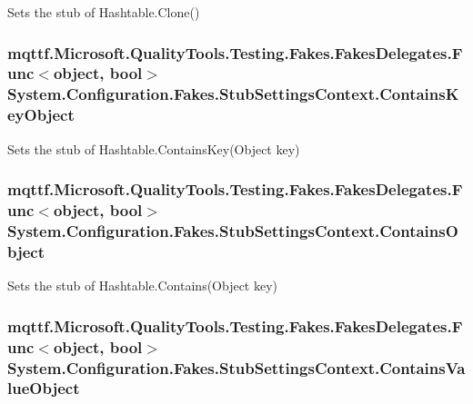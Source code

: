 Sets the stub of Hashtable.\-Clone()

\hypertarget{class_system_1_1_configuration_1_1_fakes_1_1_stub_settings_context_a4f23811f03a3a5e4f42611fa9592d583}{
\subsubsection[{Contains\-Key\-Object}]{\setlength{\rightskip}{0pt plus 5cm}mqttf.\-Microsoft.\-Quality\-Tools.\-Testing.\-Fakes.\-Fakes\-Delegates.\-Func$<$object, bool$>$ System.\-Configuration.\-Fakes.\-Stub\-Settings\-Context.\-Contains\-Key\-Object}}\label{class_system_1_1_configuration_1_1_fakes_1_1_stub_settings_context_a4f23811f03a3a5e4f42611fa9592d583}


Sets the stub of Hashtable.\-Contains\-Key(\-Object key)

\hypertarget{class_system_1_1_configuration_1_1_fakes_1_1_stub_settings_context_aee986a4c0cdcb11d5a98efda0f920348}{
\subsubsection[{Contains\-Object}]{\setlength{\rightskip}{0pt plus 5cm}mqttf.\-Microsoft.\-Quality\-Tools.\-Testing.\-Fakes.\-Fakes\-Delegates.\-Func$<$object, bool$>$ System.\-Configuration.\-Fakes.\-Stub\-Settings\-Context.\-Contains\-Object}}\label{class_system_1_1_configuration_1_1_fakes_1_1_stub_settings_context_aee986a4c0cdcb11d5a98efda0f920348}


Sets the stub of Hashtable.\-Contains(\-Object key)

\hypertarget{class_system_1_1_configuration_1_1_fakes_1_1_stub_settings_context_a06c74d3c76d01c2b664995064a220819}{
\subsubsection[{Contains\-Value\-Object}]{\setlength{\rightskip}{0pt plus 5cm}mqttf.\-Microsoft.\-Quality\-Tools.\-Testing.\-Fakes.\-Fakes\-Delegates.\-Func$<$object, bool$>$ System.\-Configuration.\-Fakes.\-Stub\-Settings\-Context.\-Contains\-Value\-Object}}\label{class_system_1_1_configuration_1_1_fakes_1_1_stub_settings_context_a06c74d3c76d01c2b664995064a220819}


